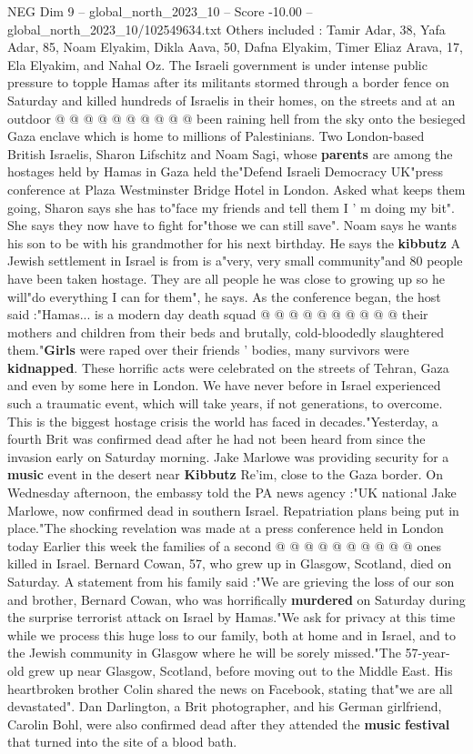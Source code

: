 \begin{textsample}{NEG Dim 9 – global\_north\_2023\_10 – Score -10.00 – global\_north\_2023\_10/102549634.txt}
Others included : Tamir Adar, 38, Yafa Adar, 85, Noam Elyakim, Dikla Aava, 50, Dafna Elyakim, Timer Eliaz Arava, 17, Ela Elyakim, and Nahal Oz.
The Israeli government is under intense public pressure to topple Hamas after its militants stormed through a border fence on Saturday and killed hundreds of Israelis in their homes, on the streets and at an outdoor @ @ @ @ @ @ @ @ @ @ been raining hell from the sky onto the besieged Gaza enclave which is home to millions of Palestinians.
Two London-based British Israelis, Sharon Lifschitz and Noam Sagi, whose \textbf{parents} are among the hostages held by Hamas in Gaza held the"Defend Israeli Democracy UK"press conference at Plaza Westminster Bridge Hotel in London.
Asked what keeps them going, Sharon says she has to"face my friends and tell them I ' m doing my bit".
She says they now have to fight for"those we can still save".
Noam says he wants his son to be with his grandmother for his next birthday.
He says the \textbf{kibbutz} A Jewish settlement in Israel is from is a"very, very small community"and 80 people have been taken hostage.
They are all people he was close to growing up so he will"do everything I can for them", he says.
As the conference began, the host said :"Hamas... is a modern day death squad @ @ @ @ @ @ @ @ @ @ their mothers and children from their beds and brutally, cold-bloodedly slaughtered them."\textbf{Girls} were raped over their friends ' bodies, many survivors were \textbf{kidnapped}.
These horrific acts were celebrated on the streets of Tehran, Gaza and even by some here in London.
We have never before in Israel experienced such a traumatic event, which will take years, if not generations, to overcome.
This is the biggest hostage crisis the world has faced in decades."Yesterday, a fourth Brit was confirmed dead after he had not been heard from since the invasion early on Saturday morning.
Jake Marlowe was providing security for a \textbf{music} event in the desert near \textbf{Kibbutz} Re'im, close to the Gaza border.
On Wednesday afternoon, the embassy told the PA news agency :"UK national Jake Marlowe, now confirmed dead in southern Israel.
Repatriation plans being put in place."The shocking revelation was made at a press conference held in London today Earlier this week the families of a second @ @ @ @ @ @ @ @ @ @ ones killed in Israel.
Bernard Cowan, 57, who grew up in Glasgow, Scotland, died on Saturday.
A statement from his family said :"We are grieving the loss of our son and brother, Bernard Cowan, who was horrifically \textbf{murdered} on Saturday during the surprise terrorist attack on Israel by Hamas."We ask for privacy at this time while we process this huge loss to our family, both at home and in Israel, and to the Jewish community in Glasgow where he will be sorely missed."The 57-year-old grew up near Glasgow, Scotland, before moving out to the Middle East.
His heartbroken brother Colin shared the news on Facebook, stating that"we are all devastated".
Dan Darlington, a Brit photographer, and his German girlfriend, Carolin Bohl, were also confirmed dead after they attended the \textbf{music} \textbf{festival} that turned into the site of a blood bath.


\end{textsample}
